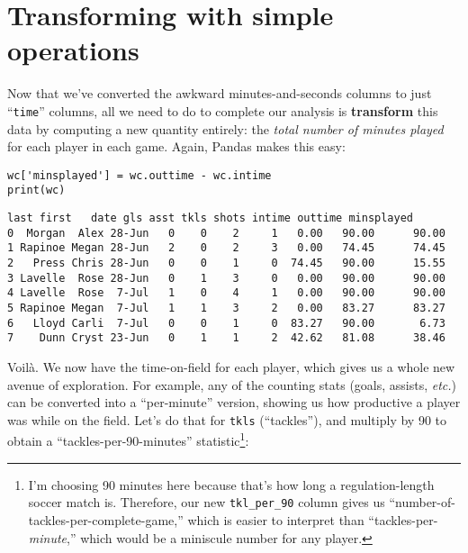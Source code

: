 
\section{Transforming with simple operations}



Now that we've converted the awkward minutes-and-seconds columns to just
``\texttt{time}'' columns, all we need to do to complete our analysis is
\textbf{transform} this data by computing a new quantity entirely: the
\textit{total number of minutes played} for each player in each game. Again,
Pandas makes this easy:

\begin{Verbatim}[fontsize=\footnotesize,samepage=true,frame=single,framesep=3mm]
wc['minsplayed'] = wc.outtime - wc.intime
print(wc)
\end{Verbatim}
\vspace{-.2in}

\begin{Verbatim}[fontsize=\scriptsize,samepage=true,frame=leftline,framesep=5mm,framerule=1mm]
     last first   date gls asst tkls shots intime outtime minsplayed
0  Morgan  Alex 28-Jun   0    0    2     1   0.00   90.00      90.00
1 Rapinoe Megan 28-Jun   2    0    2     3   0.00   74.45      74.45
2   Press Chris 28-Jun   0    0    1     0  74.45   90.00      15.55
3 Lavelle  Rose 28-Jun   0    1    3     0   0.00   90.00      90.00
4 Lavelle  Rose  7-Jul   1    0    4     1   0.00   90.00      90.00
5 Rapinoe Megan  7-Jul   1    1    3     2   0.00   83.27      83.27
6   Lloyd Carli  7-Jul   0    0    1     0  83.27   90.00       6.73
7    Dunn Cryst 23-Jun   0    1    1     2  42.62   81.08      38.46
\end{Verbatim}


Voil\`{a}. We now have the time-on-field for each player, which gives us a
whole new avenue of exploration. For example, any of the counting stats (goals,
assists, \textit{etc.}) can be converted into a ``per-minute'' version, showing
us how productive a player was while on the field. Let's do that for
\texttt{tkls} (``tackles''), and multiply by 90 to obtain a ``tackles-per-90-minutes''
statistic\footnote{I'm choosing 90 minutes here because that's how long a
regulation-length soccer match is. Therefore, our new \texttt{tkl\_per\_90}
column gives us ``number-of-tackles-per-complete-game,'' which is easier to
interpret than ``tackles-per-\textit{minute},'' which would be a miniscule
number for any player.}:

